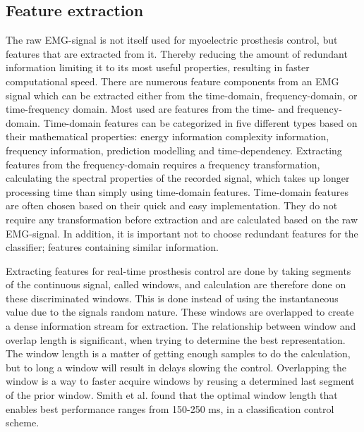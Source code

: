 \subsection{Feature extraction}

The raw EMG-signal is not itself used for myoelectric prosthesis control, but features that are extracted from it. Thereby reducing the amount of redundant information limiting it to its most useful properties, resulting in faster computational speed. 
There are numerous feature components from an EMG signal which can be extracted either from the time-domain, frequency-domain, or time-frequency domain. Most used are features from the time- and frequency-domain. Time-domain features can be categorized in five different types based on their mathematical properties: energy information complexity information, frequency information, prediction modelling and time-dependency. Extracting features from the frequency-domain requires a frequency transformation, calculating the spectral properties of the recorded signal, which takes up longer processing time than simply using time-domain features. 
Time-domain features are often chosen based on their quick and easy implementation. They do not require any transformation before extraction and are calculated based on the raw EMG-signal. In addition, it is important not to choose redundant features for the classifier; features containing similar information. \cite{Phiny2012} 

Extracting features for real-time prosthesis control are done by taking segments of the continuous signal, called windows, and calculation are therefore done on these discriminated windows. This is done instead of using the instantaneous value due to the signals random nature. These windows are overlapped to create a dense information stream for extraction. The relationship between window and overlap length is significant, when trying to determine the best representation. The window length is a matter of getting enough samples to do the calculation, but to long a window will result in delays slowing the control. Overlapping the window is a way to faster acquire windows by reusing a determined last segment of the prior window. Smith et al. found that the optimal window length that enables best performance ranges from 150-250 ms, in a classification control scheme. \cite{Smith2014} 
